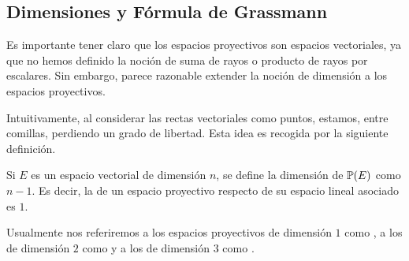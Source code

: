 \subsection{Dimensiones y Fórmula de Grassmann}
Es importante tener claro que los espacios proyectivos  son espacios vectoriales, ya que no hemos definido la noción de suma de rayos o producto de rayos por escalares. Sin embargo, parece razonable extender la noción de dimensión a los espacios proyectivos.

Intuitivamente, al considerar las rectas vectoriales como puntos, estamos, entre comillas, perdiendo un grado de libertad. Esta idea es recogida por la siguiente definición. 
\begin{defi}
	\label{C1_def_dimension}
	Si $E$ es un espacio vectorial de dimensión $n$, se define la dimensión de $\mathbb{P}(E)$ como $n-1$. Es decir, la  de un espacio proyectivo respecto de su espacio lineal asociado es $1$.
\end{defi}

Usualmente nos referiremos a los espacios proyectivos de dimensión $1$ como , a los de dimensión $2$ como  y a los de dimensión $3$ como .

